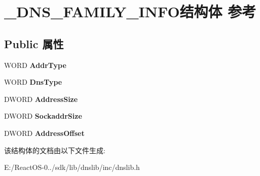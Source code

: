 \hypertarget{struct___d_n_s___f_a_m_i_l_y___i_n_f_o}{}\section{\+\_\+\+D\+N\+S\+\_\+\+F\+A\+M\+I\+L\+Y\+\_\+\+I\+N\+F\+O结构体 参考}
\label{struct___d_n_s___f_a_m_i_l_y___i_n_f_o}
\subsection*{Public 属性}
\begin{DoxyCompactItemize}
\item 
\mbox{\label{struct___d_n_s___f_a_m_i_l_y___i_n_f_o_a44f36722e04e9a04e19049a3404a21e7}} 
W\+O\+RD {\bfseries Addr\+Type}
\item 
\mbox{\label{struct___d_n_s___f_a_m_i_l_y___i_n_f_o_a9109cca2c5ca40e644946e05626b6b96}} 
W\+O\+RD {\bfseries Dns\+Type}
\item 
\mbox{\label{struct___d_n_s___f_a_m_i_l_y___i_n_f_o_a31d3de3dc7900ebb3b14cd35ee37e673}} 
D\+W\+O\+RD {\bfseries Address\+Size}
\item 
\mbox{\label{struct___d_n_s___f_a_m_i_l_y___i_n_f_o_a9d60a845d1b84058553fe5257177c815}} 
D\+W\+O\+RD {\bfseries Sockaddr\+Size}
\item 
\mbox{\label{struct___d_n_s___f_a_m_i_l_y___i_n_f_o_a6f56b60500df684b9db8528e93aa152e}} 
D\+W\+O\+RD {\bfseries Address\+Offset}
\end{DoxyCompactItemize}


该结构体的文档由以下文件生成\+:\begin{DoxyCompactItemize}
\item 
E\+:/\+React\+O\+S-\/0../sdk/lib/dnslib/inc/dnslib.\+h\end{DoxyCompactItemize}
